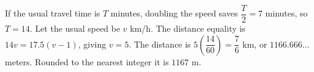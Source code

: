 If the usual travel time is $T$ minutes, doubling the speed saves $\dfrac{T}{2}=7$ minutes, so $T=14$. Let the usual speed be $v$ km/h. The distance equality is $14v=17.5(v-1)$, giving $v=5$. The distance is $5(\dfrac{14}{60})=\dfrac{7}{6}$ km, or $1166.666\ldots$ meters. Rounded to the nearest integer it is $\boxed{1167\text{ m}}$.
